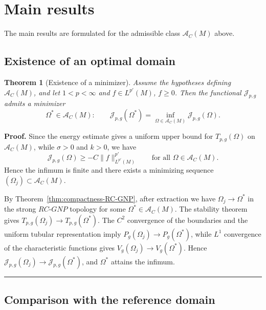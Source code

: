 \documentclass{article}
\newtheorem{theorem}{Theorem}[section]
\newenvironment{proof}[1][Proof]{\textbf{#1.} }{\hfill\rule{0.5em}{0.5em}}
\begin{document}
\section{Main results}

The main results are formulated for the admissible class $\mathcal A_C(M)$ above.

\subsection{Existence of an optimal domain}

\begin{theorem}[Existence of a minimizer]
\label{thm:existence-minimizer}
Assume the hypotheses defining $\mathcal A_C(M)$, and let
$1<p<\infty$ and $f\in L^{p'}(M)$, $f\geq0$. Then the functional
$\mathcal J_{p,g}$ admits a minimizer
\[
\Omega^\ast\in \mathcal A_C(M):
\qquad
\mathcal J_{p,g}(\Omega^\ast)
=
\inf_{\Omega\in \mathcal A_C(M)}\mathcal J_{p,g}(\Omega).
\]
\end{theorem}

\begin{proof}
Since the energy estimate gives a uniform upper bound for $T_{p,g}(\Omega)$ on $\mathcal A_C(M)$, while $\sigma>0$ and $k>0$, we have
\[
\mathcal J_{p,g}(\Omega)
\geq
-C\|f\|_{L^{p'}(M)}^{p'}
\qquad\text{for all }\Omega\in\mathcal A_C(M).
\]
Hence the infimum is finite and there exists a minimizing sequence $(\Omega_j)\subset\mathcal A_C(M)$.

By Theorem~\ref{thm:compactness-RC-GNP}, after extraction we have $\Omega_j\to\Omega^*$ in the strong $RC$-$GNP$ topology for some $\Omega^*\in\mathcal A_C(M)$. The stability theorem gives $T_{p,g}(\Omega_j)\to T_{p,g}(\Omega^*)$. The $C^2$ convergence of the boundaries and the uniform tubular representation imply $P_g(\Omega_j)\to P_g(\Omega^*)$, while $L^1$ convergence of the characteristic functions gives $V_g(\Omega_j)\to V_g(\Omega^*)$. Hence $\mathcal J_{p,g}(\Omega_j)\to\mathcal J_{p,g}(\Omega^*)$, and $\Omega^*$ attains the infimum.\end{proof}

\subsection{Comparison with the reference domain}
\end{document}
